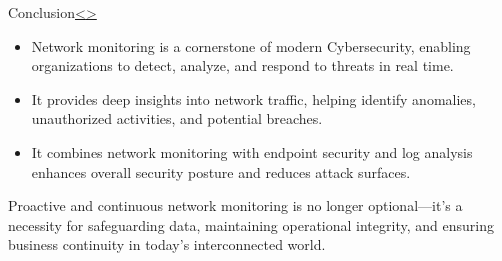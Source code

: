 \documentclass[12pt]{article}
\newenvironment{instructionblock}{\Large\bgroup}{\egroup}
\newcommand{\bi}{\begin{itemize}}
\newcommand{\ei}{\end{itemize}}
\begin{document}
\pagebreak

\begin{slide}{Conclusion}{\hyperref[slide 19]{\textless}\hyperref[slide 21]{\textgreater}}
	\begin{instructionblock}
		\bi
			\item Network monitoring is a cornerstone of modern Cybersecurity, enabling organizations to detect, analyze, and respond to threats in real time.
            \item It provides deep insights into network traffic, helping identify anomalies, unauthorized activities, and potential breaches.
			\item It combines network monitoring with endpoint security and log analysis enhances overall security posture and reduces attack surfaces.
		\ei
	\end{instructionblock}
\end{slide}
		Proactive and continuous network monitoring is no longer optional—it's a necessity for safeguarding data, maintaining operational integrity, and ensuring business continuity in today's interconnected world.
\vfill
	\cite{book}
\pagebreak
%
\end{document}
